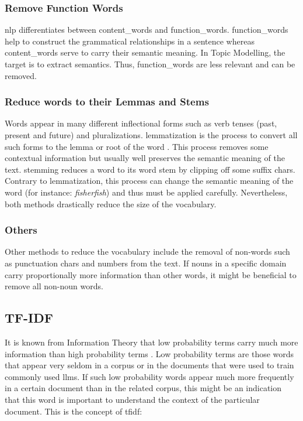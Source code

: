 \subsubsection{Remove Function Words}\label{subsubsec:remove-function-words}
\gls{nlp} differentiates between \gls{content_words} and \gls{function_words}.
\gls{function_words} help to construct the grammatical relationships in a sentence whereas \gls{content_words} serve to carry their semantic meaning.
In Topic Modelling, the target is to extract semantics. Thus, \gls{function_words} are less relevant and can be removed.

\subsubsection{Reduce words to their Lemmas and Stems}\label{subsubsec:word-lemmas}
Words appear in many different inflectional forms such as verb tenses (past, present and future) and pluralizations.
\gls{lemmatization} is the process to convert all such forms to the lemma or root of the word \cite{Lemmatization}.
This process removes some contextual information but usually well preserves the semantic meaning of the text.
\gls{stemming} reduces a word to its word stem by clipping off some suffix chars.
Contrary to \gls{lemmatization}, this process can change the semantic meaning of the word (for instance: \emph{fisher}\textrightarrow \emph{fish}) and thus must be
applied carefully.
Nevertheless, both methods drastically reduce the size of the \gls{vocabulary}.

\subsubsection{Others}\label{subsubsec:others}
Other methods to reduce the \gls{vocabulary} include the removal of non-words such as punctuation chars and numbers from the text.
If nouns in a specific domain carry proportionally more information than other words, it might be beneficial to remove all non-noun words.


\subsection{TF-IDF}\label{subsec:tf-idf}
It is known from Information Theory that low probability terms carry much more information than high probability terms \cite{EntropyInformationTheory}.
Low probability terms are those words that appear very seldom in a \gls{corpus} or in the \glspl{document} that were used to train commonly used \glspl{llm}.
If such low probability words appear much more frequently in a certain \gls{document} than in the related \gls{corpus}, this might be an indication
that this word is important to understand the context of the particular \gls{document}.
This is the concept of \gls{tfidf}:

